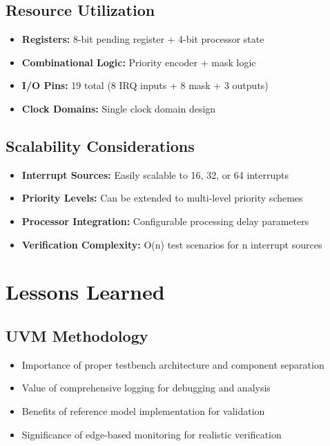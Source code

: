 \documentclass[12pt,a4paper]{article}
\begin{document}
\subsection{Resource Utilization}
\begin{itemize}
    \item \textbf{Registers:} 8-bit pending register + 4-bit processor state
    \item \textbf{Combinational Logic:} Priority encoder + mask logic
    \item \textbf{I/O Pins:} 19 total (8 IRQ inputs + 8 mask + 3 outputs)
    \item \textbf{Clock Domains:} Single clock domain design
\end{itemize}

\subsection{Scalability Considerations}
\begin{itemize}
    \item \textbf{Interrupt Sources:} Easily scalable to 16, 32, or 64 interrupts
    \item \textbf{Priority Levels:} Can be extended to multi-level priority schemes
    \item \textbf{Processor Integration:} Configurable processing delay parameters
    \item \textbf{Verification Complexity:} O(n) test scenarios for n interrupt sources
\end{itemize}

\section{Lessons Learned}
\subsection{UVM Methodology}
\begin{itemize}
    \item Importance of proper testbench architecture and component separation
    \item Value of comprehensive logging for debugging and analysis
    \item Benefits of reference model implementation for validation
    \item Significance of edge-based monitoring for realistic verification
\end{itemize}
\end{document}
